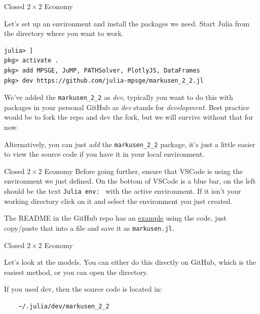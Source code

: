 \documentclass{beamer}
\begin{document}
\begin{frame}[fragile]{Closed $2\times 2$ Economy}

    Let's set up an environment and install the packages we need. Start Julia from the directory where you want to work. 

    \begin{verbatim}
julia> ]
pkg> activate .
pkg> add MPSGE, JuMP, PATHSolver, PlotlyJS, DataFrames
pkg> dev https://github.com/julia-mpsge/markusen_2_2.jl
    \end{verbatim}

    We've added the \texttt{markusen\_2\_2} as \emph{dev}, typically you want to do this with packages in your personal GitHub as \emph{dev} stands for \emph{development}. Best practice would be to fork the repo and dev the fork, but we will survive without that for now.

    \vspace{.5cm}

    Alternatively, you can just \emph{add} the \texttt{markusen\_2\_2} package, it's just a little easier to view the source code if you have it in your local environment.

\end{frame}

\begin{frame}{Closed $2\times 2$ Economy}
    Before going further, ensure that VSCode is using the environment we just defined. On the bottom of VSCode is a blue bar, on the left should be the text \texttt{Julia env: } with the active environment. If it isn't your working directory click on it and select the environment you just created.

    \vspace{.5cm}

    The README in the GitHub repo has an \href{https://github.com/julia-mpsge/markusen\_2\_2.jl\#example-code}{example} using the code, just copy/paste that into a file and save it as \texttt{markusen.jl}.
\end{frame}


\begin{frame}[fragile]{Closed $2\times 2$ Economy}

    Let's look at the models. You can either do this directly on GitHub, which is the easiest method, or you can open the directory.

    \vspace{.5cm}

    If you used dev, then the source code is located in:

    \begin{verbatim}
    ~/.julia/dev/markusen_2_2
    \end{verbatim}

    \vspace{.5cm}

\end{frame}
\end{document}
